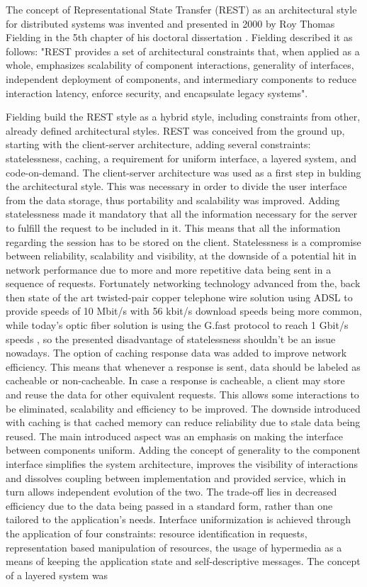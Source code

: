 \documentclass[12pt,a4paper,twoside]{report}
\begin{document}
The concept of Representational State Transfer (REST) as an architectural style for distributed systems was invented and presented in 2000 by Roy Thomas Fielding in the 5th chapter of his doctoral dissertation \cite{fielding_rest_definition}. Fielding described it as follows: "REST provides a set of architectural constraints that, when applied as a whole, emphasizes scalability of component interactions, generality of interfaces, independent deployment of components, and intermediary components to reduce interaction latency, enforce security, and encapsulate legacy systems".

Fielding build the REST style as a hybrid style, including constraints from other, already defined architectural styles. REST was conceived from the ground up, starting with the client-server architecture, adding several constraints: statelessness, caching, a requirement for uniform interface, a layered system, and code-on-demand. The client-server architecture was used as a first step in bulding the architectural style. This was necessary in order to divide the user interface from the data storage, thus portability and scalability was improved. Adding statelessness made it mandatory that all the information necessary for the server to fulfill the request to be included in it. This means that all the information regarding the session has to be stored on the client. Statelessness is a compromise between reliability, scalability and visibility, at the downside of a potential hit in network performance due to more and more repetitive data being sent in a sequence of requests. Fortunately networking technology advanced from the, back then state of the art twisted-pair copper telephone wire solution using ADSL to provide speeds of 10 Mbit/s with 56 kbit/s download speeds being more common, while today's optic fiber solution is using the G.fast protocol to reach 1 Gbit/s speeds \cite{historical_net_speeds}, so the presented disadvantage of statelessness shouldn't be an issue nowadays. The option of caching response data was added to improve network efficiency. This means that whenever a response is sent, data should be labeled as cacheable or non-cacheable. In case a response is cacheable, a client may store and reuse the data for other equivalent requests. This allows some interactions to be eliminated, scalability and efficiency to be improved. The downside introduced with caching is that cached memory can reduce reliability due to stale data being reused. The main introduced aspect was an emphasis on making the interface between components uniform. Adding the concept of generality to the component interface simplifies the system architecture, improves the visibility of interactions and dissolves coupling between implementation and provided service, which in turn allows independent evolution of the two. The trade-off lies in decreased efficiency due to the data being passed in a standard form, rather than one tailored to the application's needs. Interface uniformization is achieved through the application of four constraints: resource identification in requests, representation based manipulation of resources, the usage of hypermedia as a means of keeping the application state and self-descriptive messages. The concept of a layered system was 
\end{document}
